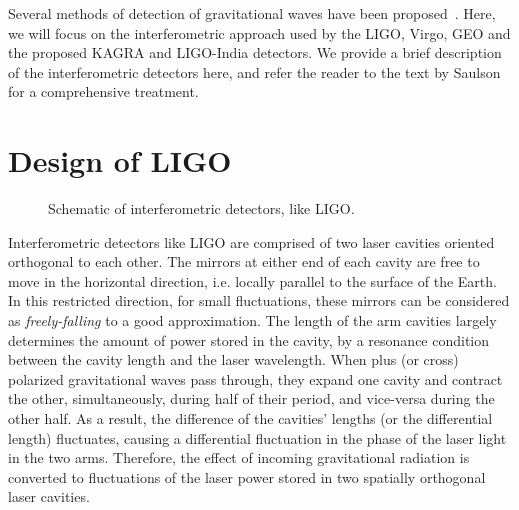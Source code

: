 
Several methods of detection of gravitational waves have been 
proposed~\cite{PhysRevLett.20.1307,PhysRevD.54.1264,1978SvA....22...36S,
1979ApJ...234.1100D}. Here, we will focus on the interferometric approach
used by the LIGO, Virgo, GEO and the proposed KAGRA
and LIGO-India detectors. We provide a brief description of the interferometric
detectors here, and refer the reader to the text by 
Saulson~\cite{Saulson:1995zi} for a comprehensive treatment.

\section{Design of LIGO}\label{sec:ligo_construction}
\begin{figure}
 \begin{center}
 \end{center}
\caption{\label{fig:ligo}Schematic of interferometric detectors, like LIGO.}
\end{figure}
%
Interferometric detectors like LIGO are comprised of two laser cavities oriented 
orthogonal to each other. The mirrors at either end of each cavity are free to move 
in the horizontal direction, i.e. locally parallel to the surface of the Earth. 
In this restricted direction, for small fluctuations, these mirrors can be
considered as {\it freely-falling} to a good approximation.
The length of the arm cavities largely determines the amount of power stored
in the cavity, by a resonance condition between the cavity length and the 
laser wavelength. 
%
When plus (or cross) polarized gravitational waves pass through, they expand 
one cavity and contract the other, simultaneously, during half of their period,
and vice-versa during the other half. As a result, the difference of the cavities'
lengths (or the differential length) fluctuates, causing a differential fluctuation
in the phase of the laser light in the two arms.
% 
Therefore, the effect of incoming gravitational radiation is converted to 
fluctuations of the laser power stored in two spatially orthogonal laser cavities.

